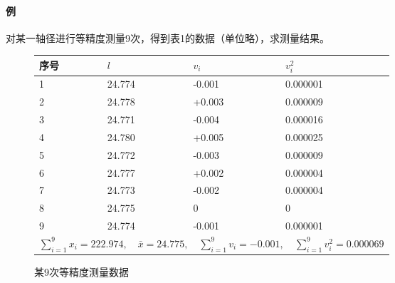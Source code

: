 \paragraph{例 } 对某一轴径进行等精度测量9次，得到表1的数据（单位略），求测量结果。

\begin{figure}[H]
	\centering
	\begin{tabular}{|p{3cm}<{\centering}|p{3cm}<{\centering}|p{3cm}<{\centering}|p{3cm}<{\centering}|}
	\hline 
		序号	&  $ l $&  $ v_i $&  $ v_i^2 $\\	\hline 
		1&  24.774&  -0.001&  0.000001\\ \hline 
		2&  24.778&  +0.003&  0.000009\\ \hline 
		3&  24.771&  -0.004&  0.000016\\ \hline
		4&  24.780&  +0.005&  0.000025\\ \hline
		5&  24.772&  -0.003&  0.000009\\ \hline
		6&  24.777&  +0.002&  0.000004\\ \hline
		7&  24.773&  -0.002&  0.000004\\ \hline
		8&  24.775&		  0&  		 0\\ \hline
		9&  24.774&  -0.001&  0.000001\\ \hline
		\multicolumn{4}{|c|}{$ \sum\limits_{i=1}^{9}x_i=222.974,\quad\bar{x}=24.775,\quad\sum\limits_{i=1}^{9}v_i=-0.001,\quad\sum\limits_{i=1}^{9}v_i^2 =0.000069$}\\ \hline
	\end{tabular}
	\captionsetup{type=table}
	\caption{某9次等精度测量数据}
\end{figure}
